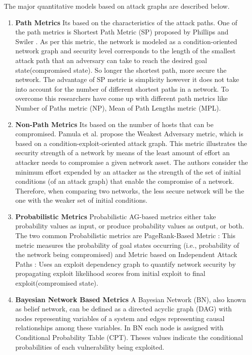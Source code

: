 \documentclass[pdftex,english,oribibl]{llncs}
\begin{document}
The major quantitative models based on attack graphs are described below.
\begin{enumerate}
	\item {\textbf{Path Metrics}\newline 
		Its based on the characteristics of the attack paths. One of the path metrics is Shortest Path Metric (SP) proposed by Phillips and Swiler \cite{CynthiaPhillips1998}. As per this metric, the network is modeled as a condition-oriented network graph and security level corresponds to the length of the smallest attack path that an adversary can take to reach the desired goal state(compromised state). So longer the shortest path, more secure the network. The advantage of SP metric is simplicity however it does not take into account for the number of different shortest paths in a network. To overcome this researchers have come up with different path metrics like Number of Paths metric (NP), Mean of Path Lengths metric (MPL).}
	
	\item {\textbf{Non-Path Metrics}\newline 
		Its based on the number of hosts that can be compromised. Pamula et al. \cite{J.Pamula2006} propose the Weakest Adversary metric, which is based on a condition-exploit-oriented attack graph.
		This metric illustrates the security strength of a network by means of the least amount of effort an attacker needs to compromise a given network asset. The authors consider the minimum effort expended by an attacker as the strength of the set of initial conditions (of an attack graph) that enable the compromise of a network. Therefore, when comparing two networks, the less secure network will be the one with the weaker set of initial conditions.}
	
	\item {\textbf{Probabilistic Metrics}\newline
		Probabilistic AG-based metrics either take probability values as input, or produce probability values as output, or both. The two common Probabilistic metrics are PageRank-Based Metric :  This metric measures the probability of goal states occurring	(i.e., probability of the network being compromised) and Metric based on Independent Attack Paths : Uses an exploit dependency graph to quantify network security by propagating exploit likelihood scores from initial exploit to final exploit(compromised state).}
	
		\item {\textbf{Bayesian Network Based Metrics}\newline
		A Bayesian Network (BN), also known as belief network, can be defined as a directed acyclic graph (DAG) with nodes representing variables of a system and edges representing causal relationships among these variables. In BN each node is assigned with Conditional Probability Table (CPT). Theses values indicate the conditional probabilities of each vulnerability being exploited.
		}
\end{enumerate}
\end{document}
